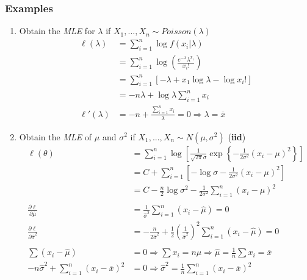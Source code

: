 \documentclass{article}
\begin{document}
\subsubsection{Examples}
\begin{enumerate}
    \item Obtain the \textit{MLE} for $\lambda$ if $X_1,...,X_n \sim Poisson(\lambda)$
    \begin{equation*}
        \begin{split}
            \ell(\lambda) &= \sum_{i=1}^n \log f(x_i|\lambda)\\
            &= \sum_{i=1}^n \log \left(\frac{e^{-\lambda} \lambda^{x_i}}{x_i!} \right)\\
            &= \sum_{i=1}^n \left[-\lambda + x_1 \log \lambda - \log x_i! \right]\\
            &= -n\lambda + \log \lambda \sum_{i=1}^n x_i\\
            \ell'(\lambda) &= -n + \frac{\sum_{i=1}^n x_i}{\lambda} = 0 \Rightarrow \lambda = \overline{x}
        \end{split}
    \end{equation*}
    
    \item Obtain the \textit{MLE} of $\mu$ and $\sigma^2$ if $X_1,...,X_n \sim N(\mu,\sigma^2)$ (\textbf{iid})
    \begin{equation*}
        \begin{split}
            \ell(\theta) &= \sum_{i=1}^n \log \left[ \frac{1}{\sqrt{2\pi}\sigma} \exp \left\{ -\frac{1}{2\sigma^2}(x_i-\mu)^2 \right\} \right]\\
            &= C + \sum_{i=1}^n \left[-\log \sigma - \frac{1}{2\sigma^2}(x_i-\mu)^2 \right]\\
            &= C - \frac{n}{2}\log \sigma^2 - \frac{1}{2\sigma^2}\sum_{i=1}^n (x_i-\mu)^2\\
            \\
            \frac{\partial \ell}{\partial \hat{\mu}} &= \frac{1}{\hat{\sigma}^2} \sum_{i=1}^n (x_i-\hat{\mu}) = 0\\
            \frac{\partial \ell}{\partial \hat{\sigma}^2} &= -\frac{n}{2 \hat{\sigma}^2}  + \frac{1}{2}\left(\frac{1}{\hat{\sigma}^2} \right)^2 \sum_{i=1}^n (x_i - \hat{\mu}) = 0\\
            \\
            \sum(x_i-\hat{\mu}) &= 0 \Rightarrow \sum x_i = n\hat{\mu} \Rightarrow \hat{\mu} = \frac{1}{n}\sum x_i = \overline{x}\\
            -n\hat{\sigma}^2 + \sum_{i=1}^n (x_i - \overline{x})^2 &= 0 \Rightarrow \hat{\sigma}^2 = \frac{1}{n} \sum_{i=1}^n (x_i - \overline{x})^2
        \end{split}
    \end{equation*}
    

\end{enumerate}
\end{document}
